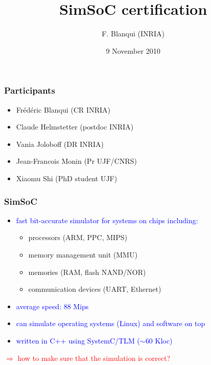 \documentclass{beamer}
\title{SimSoC certification}
\author{F. Blanqui (INRIA)}
\institute{
\red{FORMES project}\\[5mm]
LIAMA - Tsinghua University\\[5mm]
\red{\url{http://formes.asia/}}}
\date{\tiny 9 November 2010}
\newenvironment{f}[1]{\begin{frame}\frametitle{#1}}{\end{frame}}
\renewenvironment{i}{\begin{itemize}}{\end{itemize}}
\newcommand\red{\textcolor{red}}
\newcommand\blue{\textcolor{blue}}
\newcommand\vsp[1][3mm]{\vspace*{#1}}
\newcommand\A\Rightarrow
\begin{document}
\frame\titlepage


\begin{f}{Participants}

\begin{i}
\item
Fr\'ed\'eric Blanqui (CR INRIA)
\item
Claude Helmstetter (postdoc INRIA)
\item
Vania Joloboff (DR INRIA)
\item
Jean-Francois Monin (Pr UJF/CNRS)
\item
Xiaomu Shi (PhD student UJF)
\end{i}

\end{f}


\begin{f}{SimSoC}

\begin{i}\itemsep+3mm
\item
\blue{fast bit-accurate simulator for systems on chips including:}
\begin{i}
\item processors (ARM, PPC, MIPS)
\item memory management unit (MMU)
\item memories (RAM, flash NAND/NOR)
\item communication devices (UART, Ethernet)
\end{i}
\item
\blue{average speed: 88 Mips}
\item
\blue{can simulate operating systems (Linux) and software on top}
\item
\blue{written in C++ using SystemC/TLM ($\sim$60 Kloc)}
\end{i}

\vsp\pause
\red{$\A$ how to make sure that the simulation is correct?}

\end{f}

\end{document}

